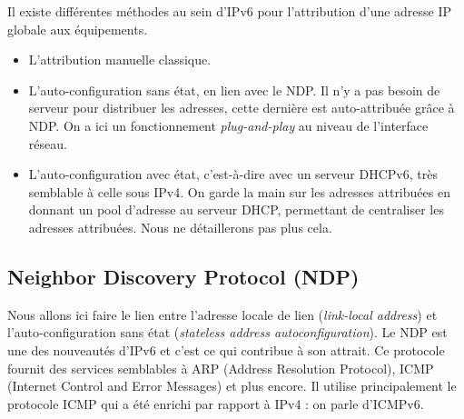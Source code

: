 Il existe différentes méthodes au sein d'IPv6 pour l’attribution d’une adresse IP globale aux équipements.

\begin{itemize}
  \item L'attribution manuelle classique.
  \item L’auto-configuration sans état, en lien avec le NDP.
Il n’y a pas besoin de serveur pour distribuer les adresses, cette dernière est auto-attribuée grâce à NDP.
On a ici un fonctionnement \emph{plug-and-play} au niveau de l’interface réseau.
  \item L’auto-configuration avec état, c’est-à-dire avec un serveur DHCPv6, très semblable à celle sous IPv4.
On garde la main sur les adresses attribuées en donnant un pool d’adresse au serveur DHCP, permettant de centraliser les adresses attribuées.
Nous ne détaillerons pas plus cela. %
\end{itemize}

\subsection{Neighbor Discovery Protocol (NDP)}

Nous allons ici faire le lien entre l’adresse locale de lien (\textit{link-local address}) et l’auto-configuration sans état (\textit{stateless address autoconfiguration}).
Le NDP est une des nouveautés d’IPv6 et c’est ce qui contribue à son attrait.
Ce protocole fournit des services semblables à ARP (Address Resolution Protocol), ICMP (Internet Control and Error Messages) et plus encore.
Il utilise principalement le protocole ICMP qui a été enrichi par rapport à IPv4 : on parle d’ICMPv6.

